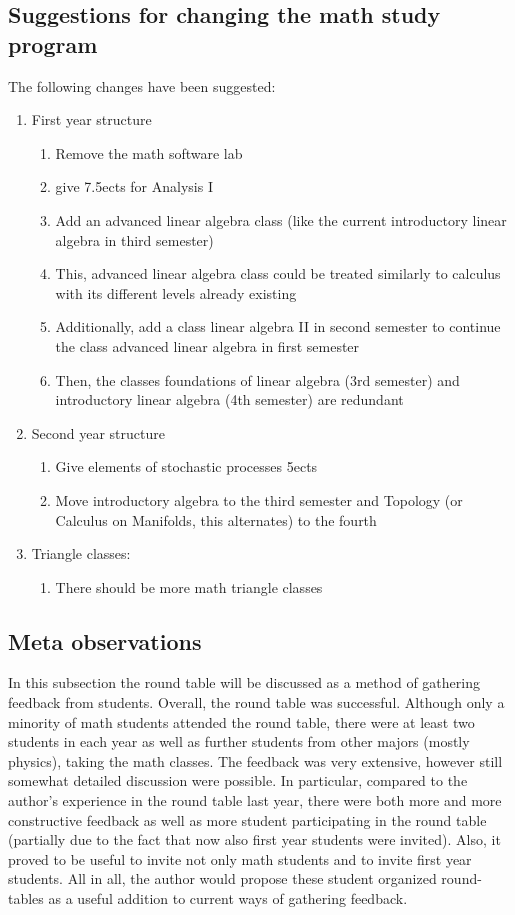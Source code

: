 \subsection{Suggestions for changing the math study program}
\label{sec-1-3}
The following changes have been suggested:
\begin{enumerate}
\item First year structure
\begin{enumerate}
\item Remove the math software lab
\item give 7.5ects for Analysis I
\item Add an advanced linear algebra class (like the current introductory linear algebra in third semester)
\item This, advanced linear algebra class could be treated similarly to calculus with its different levels already existing
\item Additionally, add a class linear algebra II in second semester to continue the class advanced linear algebra in first semester
\item Then, the classes foundations of linear algebra (3rd semester) and introductory linear algebra (4th semester) are redundant
\end{enumerate}
\item Second year structure
\begin{enumerate}
\item Give elements of stochastic processes 5ects
\item Move introductory algebra to the third semester and Topology (or Calculus on Manifolds, this alternates) to the fourth
\end{enumerate}
\item Triangle classes:
\begin{enumerate}
\item There should be more math triangle classes
\end{enumerate}
\end{enumerate}

\subsection{Meta observations}
\label{sec-1-4}
In this subsection the round table will be discussed as a method of gathering feedback from students.
Overall, the round table was successful. Although only a minority of math students attended the round table, 
there were at least two students in each year as well as further students from other majors (mostly physics), taking the math classes. 
The feedback was very extensive, however still somewhat detailed discussion were possible. 
In particular, compared to the author's experience in the round table last year, 
there were both more and more constructive feedback as well as more student participating in the round table (partially due to the fact that now also first year students were invited).
Also, it proved to be useful to invite not only math students and to invite first year students. 
All in all, the author would propose these student organized round-tables as a useful addition to current ways of gathering feedback.
